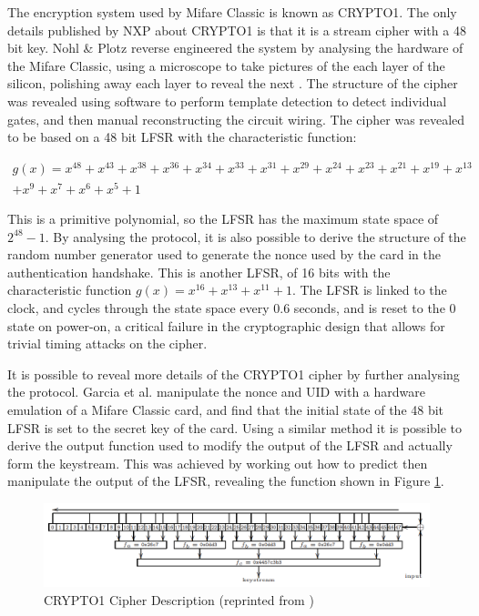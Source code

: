 \documentclass[pdflatex, a4paper,12pt]{article}
\begin{document}
The encryption system used by Mifare Classic is known as CRYPTO1. The only
details published by NXP about CRYPTO1 is that it is a stream cipher with a
48 bit key. Nohl \& Plotz reverse engineered the system by analysing the
hardware of the Mifare Classic, using a microscope to take pictures of the
each layer of the silicon, polishing away each layer to reveal the next
\cite{nohl_reverse-engineering_????}. The
structure of the cipher was revealed using software to perform template
detection to detect individual gates, and then manual reconstructing the circuit
wiring. The cipher was revealed to be based on a 48 bit LFSR with the
characteristic function:

\begin{multline*}
    g(x) = x^{48} + x^{43} + x^{38} + x^{36} + x^{34} + x^{33} + x^{31} + x^{29}
    + x^{24} + x^{23} + x^{21} + x^{19} + x^{13}\\
    + x^9 + x^7 + x^6 + x^5 + 1
\end{multline*}

This is a primitive polynomial, so the LFSR has the maximum state space of
$2^{48} - 1$. By analysing the protocol, it is also possible to derive
the structure of the random number generator used to generate the nonce used by
the card in the authentication handshake. This is another LFSR, of 16 bits with
the characteristic function $g(x) = x^{16} + x^{13} + x^{11} + 1$. The LFSR is linked to the clock, and
cycles through the state space every 0.6 seconds, and is reset to the 0 state on
power-on, a critical failure in the cryptographic design that allows for trivial
timing attacks on the cipher.

It is possible to reveal more details of the CRYPTO1 cipher by further
analysing the protocol. Garcia et al. manipulate the nonce and UID with a
hardware emulation of a Mifare Classic card, and find that the initial state of
the 48 bit LFSR is set to the secret key of the card\cite{garcia_dismantling_2008}.
Using a similar method it
is possible to derive the output function used to modify the output of the LFSR and
actually form the keystream. This was achieved by working out how to predict
then manipulate the output of the LFSR, revealing the function shown in Figure
\ref{fig:crypto1}.

\begin{figure}[htb]
\centering
\includegraphics[width=\textwidth]{img/crypto1.png}
\caption{CRYPTO1 Cipher Description (reprinted from
\protect\cite{garcia_dismantling_2008})}
\label{fig:crypto1}
\end{figure}
\end{document}
